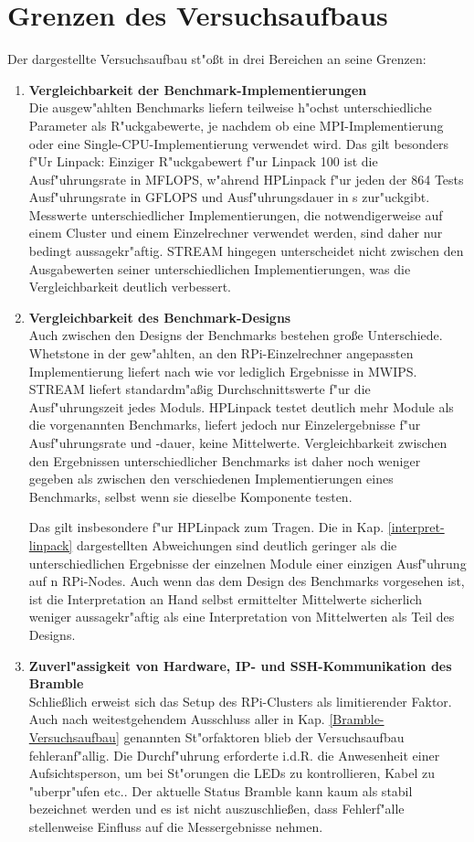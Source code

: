 \section{Grenzen des Versuchsaufbaus}\label{grenzen}
Der dargestellte Versuchsaufbau st"o\ss t in drei Bereichen an seine Grenzen: 
\begin{enumerate}
	\item \textbf{Vergleichbarkeit der Benchmark-Implementierungen}\\ 
Die ausgew"ahlten Benchmarks liefern teilweise h"ochst unterschiedliche Parameter als R"uckgabewerte, je nachdem ob eine MPI-Implementierung oder eine Single-CPU-Imple\-mentierung verwendet wird. Das gilt besonders f"Ur Linpack: Einziger R"uckgabewert f"ur Linpack 100 ist die Ausf"uhrungsrate in MFLOPS, w"ahrend HPLinpack f"ur jeden der 864 Tests Ausf"uhrungsrate in GFLOPS und Ausf"uhrungsdauer in s zur"uckgibt. Messwerte unterschiedlicher Implementierungen, die notwendigerweise auf einem Cluster und einem Einzelrechner verwendet werden, sind daher nur bedingt aussagekr"aftig. STREAM hingegen unterscheidet nicht zwischen den Ausgabewerten seiner unterschiedlichen Implementierungen, was die Vergleichbarkeit deutlich verbessert. 
	\item \textbf{Vergleichbarkeit des Benchmark-Designs}\\
Auch zwischen den Designs der Benchmarks bestehen gro\ss e Unterschiede. Whetstone in der gew"ahlten, an den RPi-Einzelrechner angepassten Implementierung liefert nach wie vor lediglich Ergebnisse in MWIPS. STREAM liefert standardm"a\ss ig Durchschnittswerte f"ur die Ausf"uhrungszeit jedes Moduls. HPLinpack testet deutlich mehr Module als die vorgenannten Benchmarks, liefert jedoch nur Einzelergebnisse f"ur Ausf"uhrungsrate und -dauer, keine Mittelwerte. Vergleichbarkeit zwischen den Ergebnissen unterschiedlicher Benchmarks ist daher noch weniger gegeben als zwischen den verschiedenen Implementierungen eines Benchmarks, selbst wenn sie dieselbe Komponente testen. 

Das gilt insbesondere f"ur HPLinpack zum Tragen. Die in Kap. \ref{interpret-linpack} dargestellten Abweichungen sind deutlich geringer als die unterschiedlichen Ergebnisse der einzelnen Module einer einzigen Ausf"uhrung auf n RPi-Nodes. Auch wenn das dem Design des Benchmarks vorgesehen ist, ist die Interpretation an Hand selbst ermittelter Mittelwerte sicherlich weniger aussagekr"aftig als eine Interpretation von Mittelwerten als Teil des Designs. 
	\item \textbf{Zuverl"assigkeit von Hardware, IP- und SSH-Kommunikation des Bramble}\\
Schlie\ss lich erweist sich das Setup des RPi-Clusters als limitierender Faktor. Auch nach weitestgehendem Ausschluss aller in Kap. \ref{Bramble-Versuchsaufbau} genannten St"orfaktoren blieb der Versuchsaufbau fehleranf"allig. Die Durchf"uhrung erforderte i.d.R. die Anwesenheit einer Aufsichtsperson, um bei St"orungen die LEDs zu kontrollieren, Kabel zu "uberpr"ufen etc.. Der aktuelle Status Bramble kann kaum als stabil bezeichnet werden und es ist nicht auszuschlie\ss en, dass Fehlerf"alle stellenweise Einfluss auf die Messergebnisse nehmen. 


\end{enumerate}
